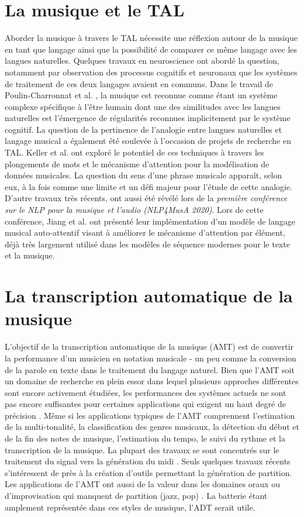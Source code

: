 \section{La musique et le TAL}
Aborder la musique à travers le TAL nécessite une réflexion autour de la musique en tant que langage ainsi que la possibilité de comparer ce même langage avec les langues naturelles. Quelques travaux en neuroscience ont abordé la question, notamment par observation des processus cognitifs et neuronaux que les systèmes de traitement de ces deux langages avaient en communs. Dans le travail de Poulin-Charronnat et al. \cite{poulincharronnat:hal-01985213}, la musique est reconnue comme étant un système complexe spécifique à l’être humain dont une des similitudes avec les langues naturelles est l’émergence de régularités reconnues implicitement par le système cognitif. La question de la pertinence de l’analogie entre langues naturelles et langage musical a également été soulevée à l’occasion de projets de recherche en TAL. Keller et al. \cite{keller:hal-03279850} ont exploré le potentiel de ces techniques à travers les plongements de mots et le mécanisme d’attention pour la modélisation de données musicales. La question du sens d’une phrase musicale apparaît, selon eux, à la fois comme une limite et un défi majeur pour l’étude de cette analogie.\\
D’autre travaux très récents, ont aussi été révélé lors de la \textit{première conférence sur le NLP pour la musique et l'audio (NLP4MusA 2020)}. Lors de cette conférence, Jiang et al. \cite{Jiang2020DiscoveringMR} ont présenté leur implémentation d’un modèle de langage musical auto-attentif visant à améliorer le mécanisme d'attention par élément, déjà très largement utilisé dans les modèles de séquence modernes pour le texte et la musique.
\section{La transcription automatique de la musique}
L'objectif de la transcription automatique de la musique (AMT) \cite{article1} est de convertir la performance d'un musicien en notation musicale - un peu comme la conversion de la parole en texte dans le traitement du langage naturel. Bien que l’AMT soit un domaine de recherche en plein essor dans lequel plusieurs approches différentes sont encore activement étudiées, les performances des systèmes actuels ne sont pas encore suffisantes pour certaines applications qui exigent un haut degré de précision \cite{article1}. Même si les applications typiques de l'AMT comprennent l'estimation de la multi-tonalité, la classification des genres musicaux, la détection du début et de la fin des notes de musique, l'estimation du tempo, le suivi du rythme et la transcription de la musique. La plupart des travaux se sont concentrés sur le traitement du signal vers la génération du midi \cite{article2}. Seuls quelques travaux récents \cite{foscarin:hal-01988990} s’intéressent de près à la création d’outils permettant la génération de partition. Les applications de l’AMT ont aussi de la valeur dans les domaines oraux ou d’improvisation qui manquent de partition (jazz, pop) \cite{article1}. La batterie étant amplement représentée dans ces styles de musique, l’ADT serait utile.
